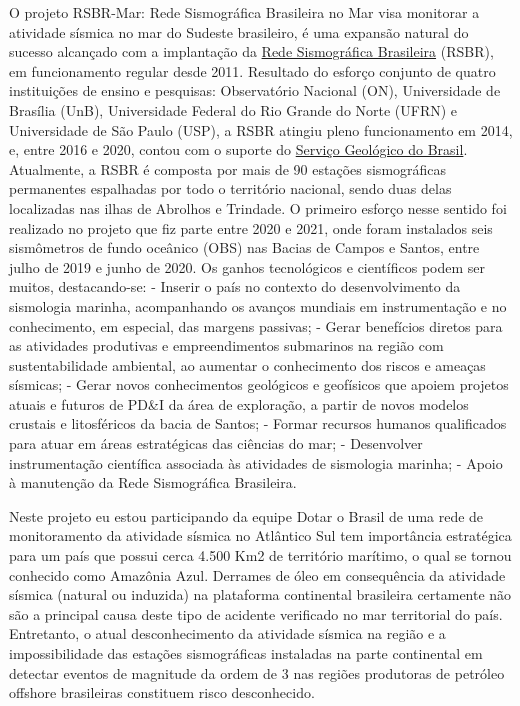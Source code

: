 \documentclass[10pt,a4paper,oneside]{book}
\begin{document}
O projeto RSBR-Mar: Rede Sismográfica Brasileira no Mar visa monitorar a atividade sísmica no mar do Sudeste brasileiro, é uma expansão natural do sucesso alcançado com a implantação da \href{www.rsbr.on.br}{Rede Sismográfica Brasileira} (RSBR), em funcionamento regular desde 2011. Resultado do esforço conjunto de quatro instituições de ensino e pesquisas: Observatório Nacional (ON), Universidade de Brasília (UnB), Universidade Federal do Rio Grande do Norte (UFRN) e Universidade de São Paulo (USP), a RSBR atingiu pleno funcionamento em 2014, e, entre 2016 e 2020, contou com o suporte do \href{https://www.sgb.gov.br/}{Serviço Geológico do Brasil}. Atualmente, a RSBR é composta por mais de 90 estações sismográficas permanentes espalhadas por todo o território nacional, sendo duas delas localizadas nas ilhas de Abrolhos e Trindade. O primeiro esforço nesse sentido foi realizado no projeto que fiz parte entre 2020 e 2021, onde foram instalados seis sismômetros de fundo oceânico (OBS) nas Bacias de Campos e Santos, entre julho de 2019 e junho de 2020. Os ganhos tecnológicos e científicos podem ser muitos, destacando-se:
- Inserir o país no contexto do desenvolvimento da sismologia marinha, acompanhando os avanços mundiais em instrumentação e no conhecimento, em especial, das margens passivas;
- Gerar benefícios diretos para as atividades produtivas e empreendimentos submarinos na região com sustentabilidade ambiental, ao aumentar o conhecimento dos riscos e ameaças sísmicas;
- Gerar novos conhecimentos geológicos e geofísicos que apoiem projetos atuais e futuros de PD\&I da área de exploração, a partir de novos modelos crustais e litosféricos da bacia de Santos;
- Formar recursos humanos qualificados para atuar em áreas estratégicas das ciências do mar;
- Desenvolver instrumentação científica associada às atividades de sismologia marinha;
- Apoio à manutenção da Rede Sismográfica Brasileira.

Neste projeto eu estou participando da equipe 
Dotar o Brasil de uma rede de monitoramento da atividade sísmica no Atlântico Sul tem importância estratégica para um país que possui cerca 4.500 Km2 de território marítimo, o qual se tornou conhecido como Amazônia Azul. Derrames de óleo em consequência da atividade sísmica (natural ou induzida) na plataforma continental brasileira certamente não são a principal causa deste tipo de acidente verificado no mar territorial do país. Entretanto, o atual desconhecimento da atividade sísmica na região e a impossibilidade das estações sismográficas instaladas na parte continental em detectar eventos de magnitude da ordem de 3 nas regiões produtoras de petróleo offshore brasileiras constituem risco desconhecido. 
\end{document}
